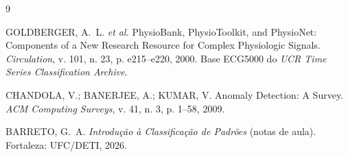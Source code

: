 \documentclass[12pt,a4paper]{scrartcl}
\begin{document}
\begin{thebibliography}{9}

GOLDBERGER, A.~L. \emph{et al.}
PhysioBank, PhysioToolkit, and PhysioNet: Components of a New Research Resource for Complex Physiologic Signals.
\emph{Circulation}, v. 101, n. 23, p. e215--e220, 2000. Base ECG5000 do \emph{UCR Time Series Classification Archive}.

CHANDOLA, V.; BANERJEE, A.; KUMAR, V.
Anomaly Detection: A Survey. \emph{ACM Computing Surveys}, v. 41, n. 3, p. 1--58, 2009.

BARRETO, G.~A.
\emph{Introdução à Classificação de Padrões} (notas de aula). Fortaleza: UFC/DETI, 2026.

\end{thebibliography}
\end{document}
